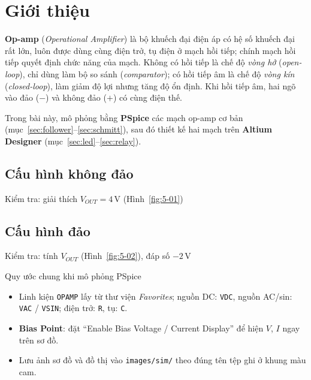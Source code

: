 \section*{Giới thiệu}
\textbf{Op-amp} (\textit{Operational Amplifier}) là bộ khuếch đại điện áp có hệ số khuếch đại rất lớn, luôn được dùng cùng điện trở, tụ điện ở mạch hồi tiếp; chính mạch hồi tiếp quyết định chức năng của mạch. Không có hồi tiếp là chế độ \textit{vòng hở} (\textit{open-loop}), chỉ dùng làm bộ so sánh (\textit{comparator}); có hồi tiếp âm là chế độ \textit{vòng kín} (\textit{closed-loop}), làm giảm độ lợi nhưng tăng độ ổn định. Khi hồi tiếp âm, hai ngõ vào đảo ($-$) và không đảo ($+$) có cùng điện thế.

Trong bài này, mô phỏng bằng \textbf{PSpice} các mạch op-amp cơ bản (mục~\ref{sec:follower}--\ref{sec:schmitt}), sau đó thiết kế hai mạch trên \textbf{Altium Designer} (mục~\ref{sec:led}--\ref{sec:relay}).

\subsection*{Cấu hình không đảo}

\begin{notebox}{Kiểm tra: giải thích $V_{OUT} = 4\,\text{V}$ (Hình~\ref{fig:5-01})}
\end{notebox}

\subsection*{Cấu hình đảo}

\begin{notebox}{Kiểm tra: tính $V_{OUT}$ (Hình~\ref{fig:5-02}), đáp số $-2\,\text{V}$}
\end{notebox}

\begin{notebox}{Quy ước chung khi mô phỏng PSpice}
\begin{itemize}[nosep]
  \item Linh kiện \texttt{OPAMP} lấy từ thư viện \textit{Favorites}; nguồn DC: \texttt{VDC}, nguồn AC/sin: \texttt{VAC} / \texttt{VSIN}; điện trở: \texttt{R}, tụ: \texttt{C}.
  \item \textbf{Bias Point}: đặt ``Enable Bias Voltage / Current Display'' để hiện $V$, $I$ ngay trên sơ đồ.
  \item Lưu ảnh sơ đồ và đồ thị vào \texttt{images/sim/} theo đúng tên tệp ghi ở khung màu cam.
\end{itemize}
\end{notebox}
